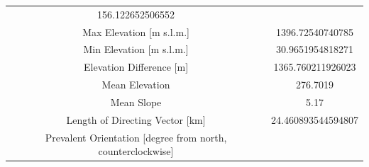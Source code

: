 \documentclass[11pt,]{article}
\begin{document}
\begin{longtable}[]{@{}cc@{}}
\begin{minipage}[t]{0.29\columnwidth}
156.122652506552\strut
\end{minipage}\tabularnewline
\begin{minipage}[t]{0.65\columnwidth}\centering\strut
Max Elevation {[}m s.l.m.{]}\strut
\end{minipage} & \begin{minipage}[t]{0.29\columnwidth}\centering\strut
1396.72540740785\strut
\end{minipage}\tabularnewline
\begin{minipage}[t]{0.65\columnwidth}\centering\strut
Min Elevation {[}m s.l.m.{]}\strut
\end{minipage} & \begin{minipage}[t]{0.29\columnwidth}\centering\strut
30.9651954818271\strut
\end{minipage}\tabularnewline
\begin{minipage}[t]{0.65\columnwidth}\centering\strut
Elevation Difference {[}m{]}\strut
\end{minipage} & \begin{minipage}[t]{0.29\columnwidth}\centering\strut
1365.760211926023\strut
\end{minipage}\tabularnewline
\begin{minipage}[t]{0.65\columnwidth}\centering\strut
Mean Elevation\strut
\end{minipage} & \begin{minipage}[t]{0.29\columnwidth}\centering\strut
276.7019\strut
\end{minipage}\tabularnewline
\begin{minipage}[t]{0.65\columnwidth}\centering\strut
Mean Slope\strut
\end{minipage} & \begin{minipage}[t]{0.29\columnwidth}\centering\strut
5.17\strut
\end{minipage}\tabularnewline
\begin{minipage}[t]{0.65\columnwidth}\centering\strut
Length of Directing Vector {[}km{]}\strut
\end{minipage} & \begin{minipage}[t]{0.29\columnwidth}\centering\strut
24.460893544594807\strut
\end{minipage}\tabularnewline
\begin{minipage}[t]{0.65\columnwidth}\centering\strut
Prevalent Orientation {[}degree from north, counterclockwise{]}\strut
\end{minipage} & \begin{minipage}[t]{0.29\columnwidth}\centering\strut

\end{minipage}
\end{longtable}
\end{document}

